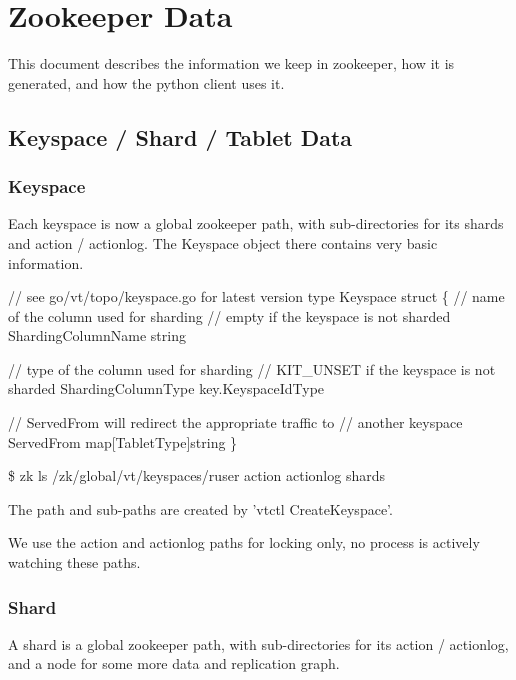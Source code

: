 \section{Zookeeper Data}\label{ZookeeperData}

This document describes the information we keep in zookeeper, how it is generated, and how the python client uses it.

\subsection{Keyspace / Shard / Tablet Data}

\subsubsection{Keyspace}

Each keyspace is now a global zookeeper path, with sub-directories for its shards and action / actionlog. The Keyspace
object there contains very basic information.

\begin{codesample2}
  // see go/vt/topo/keyspace.go for latest version
  type Keyspace struct \{
      // name of the column used for sharding
      // empty if the keyspace is not sharded
      ShardingColumnName string
  
      // type of the column used for sharding
      // KIT_UNSET if the keyspace is not sharded
      ShardingColumnType key.KeyspaceIdType
  
      // ServedFrom will redirect the appropriate traffic to
      // another keyspace
      ServedFrom map[TabletType]string
  \}
\end{codesample2}

\begin{codesample2}
  \$ zk ls /zk/global/vt/keyspaces/ruser
  action
  actionlog
  shards
\end{codesample2}

The path and sub-paths are created by 'vtctl CreateKeyspace'.

We use the action and actionlog paths for locking only, no process is actively watching these paths.

\subsubsection{Shard}

A shard is a global zookeeper path, with sub-directories for its action / actionlog, and a node for some more data and replication graph.

